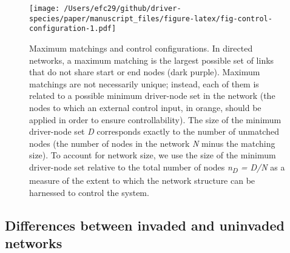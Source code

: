 \documentclass[a4paper]{artikel1}
\theoremstyle{definition}
\theoremstyle{definition}
\theoremstyle{definition}
\theoremstyle{remark}
\begin{document}
\begin{figure}
\centering
\texttt{[image: /Users/efc29/github/driver-species/paper/manuscript\_files/figure-latex/fig-control-configuration-1.pdf]}
\caption{\label{fig:fig-control-configuration}Maximum matchings and control
configurations. In directed networks, a maximum matching is the largest
possible set of links that do not share start or end nodes (dark
purple). Maximum matchings are not necessarily unique; instead, each of
them is related to a possible minimum driver-node set in the network
(the nodes to which an external control input, in orange, should be
applied in order to ensure controllability). The size of the minimum
driver-node set \emph{D} corresponds exactly to the number of unmatched
nodes (the number of nodes in the network \emph{N} minus the matching
size). To account for network size, we use the size of the minimum
driver-node set relative to the total number of nodes
\emph{n\textsubscript{D} = D/N} as a measure of the extent to which the
network structure can be harnessed to control the system.}
\end{figure}

\subsection{Differences between invaded and uninvaded
networks}\label{differences-between-invaded-and-uninvaded-networks}
\end{document}
